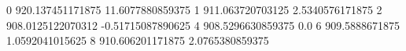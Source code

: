 0 920.137451171875 11.6077880859375
1 911.063720703125 2.5340576171875
2 908.0125122070312 -0.51715087890625
4 908.5296630859375 0.0
6 909.5888671875 1.0592041015625
8 910.606201171875 2.0765380859375
